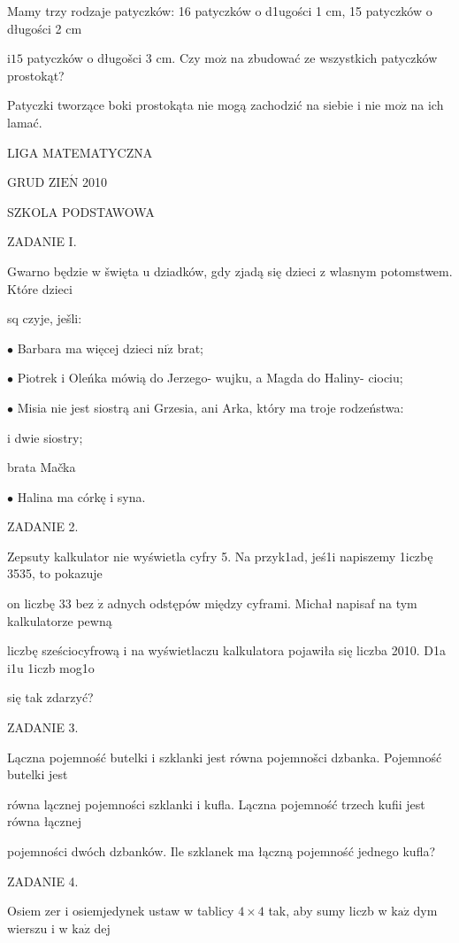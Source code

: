 \documentclass[a4paper,12pt]{article}
\begin{document}
Mamy trzy rodzaje patyczków: 16 patyczków o d1ugości 1 cm, 15 patyczków o długości 2 cm

$\mathrm{i} 15$ patyczków o długošci 3 cm. Czy $\mathrm{m}\mathrm{o}\dot{\mathrm{z}}$ na zbudować ze wszystkich patyczków prostokąt?

Patyczki tworzące boki prostokąta nie mogą zachodzić na siebie i nie $\mathrm{m}\mathrm{o}\dot{\mathrm{z}}$ na ich lamać.






LIGA MATEMATYCZNA

GRUD Z$\mathrm{I}\mathrm{E}\acute{\mathrm{N}}$ 2010

SZKOLA PODSTAWOWA

ZADANIE I.

Gwarno będzie w šwięta $\mathrm{u}$ dziadków, gdy zjadą się dzieci z wlasnym potomstwem. Które dzieci

sq czyje, ješli:

$\bullet$ Barbara ma więcej dzieci $\mathrm{n}\mathrm{i}\dot{\mathrm{z}}$ brat;

$\bullet$ Piotrek i Oleńka mówią do Jerzego- wujku, a Magda do Haliny- ciociu;

$\bullet$ Misia nie jest siostrą ani Grzesia, ani Arka, który ma troje rodzeństwa:

i dwie siostry;

brata Mačka

$\bullet$ Halina ma córkę i syna.

ZADANIE 2.

Zepsuty kalkulator nie wyświetla cyfry 5. Na przyk1ad, jeś1i napiszemy 1iczbę 3535, to pokazuje

on liczbę 33 bez $\dot{\mathrm{z}}$ adnych odstępów między cyframi. Michał napisaf na tym kalkulatorze pewną

liczbę sześciocyfrową i na wyświetlaczu kalkulatora pojawiła się liczba 2010. D1a i1u 1iczb mog1o

się tak zdarzyć?

ZADANIE 3.

Lączna pojemność butelki i szklanki jest równa pojemnošci dzbanka. Pojemność butelki jest

równa lącznej pojemności szklanki i kufla. Lączna pojemność trzech kufii jest równa łącznej

pojemności dwóch dzbanków. Ile szklanek ma łączną pojemność jednego kufla?

ZADANIE 4.

Osiem zer i osiemjedynek ustaw w tablicy $4\times 4$ tak, aby sumy liczb w $\mathrm{k}\mathrm{a}\dot{\mathrm{z}}$ dym wierszu i w $\mathrm{k}\mathrm{a}\dot{\mathrm{z}}$ dej
\end{document}
